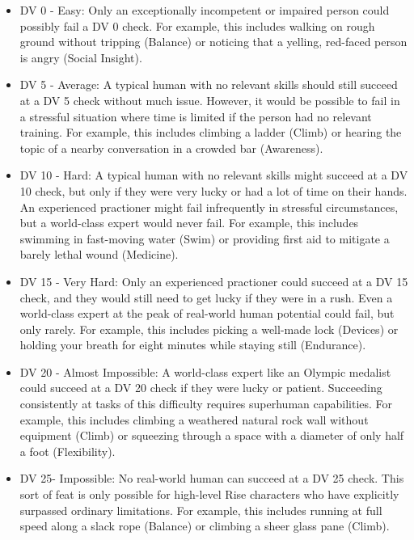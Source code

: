         \begin{itemize}
            \item DV 0 - Easy: Only an exceptionally incompetent or impaired person could possibly fail a DV 0 check. For example, this includes walking on rough ground without tripping (Balance) or noticing that a yelling, red-faced person is angry (Social Insight).
            \item DV 5 - Average: A typical human with no relevant skills should still succeed at a DV 5 check without much issue. However, it would be possible to fail in a stressful situation where time is limited if the person had no relevant training. For example, this includes climbing a ladder (Climb) or hearing the topic of a nearby conversation in a crowded bar (Awareness).
            \item DV 10 - Hard: A typical human with no relevant skills might succeed at a DV 10 check, but only if they were very lucky or had a lot of time on their hands. An experienced practioner might fail infrequently in stressful circumstances, but a world-class expert would never fail. For example, this includes swimming in fast-moving water (Swim) or providing first aid to mitigate a barely lethal wound (Medicine).
            \item DV 15 - Very Hard: Only an experienced practioner could succeed at a DV 15 check, and they would still need to get lucky if they were in a rush. Even a world-class expert at the peak of real-world human potential could fail, but only rarely. For example, this includes picking a well-made lock (Devices) or holding your breath for eight minutes while staying still (Endurance).
            \item DV 20 - Almost Impossible: A world-class expert like an Olympic medalist could succeed at a DV 20 check if they were lucky or patient. Succeeding consistently at tasks of this difficulty requires superhuman capabilities. For example, this includes climbing a weathered natural rock wall without equipment (Climb) or squeezing through a space with a diameter of only half a foot (Flexibility).
            \item DV 25\add - Impossible: No real-world human can succeed at a DV 25 check. This sort of feat is only possible for high-level Rise characters who have explicitly surpassed ordinary limitations. For example, this includes running at full speed along a slack rope (Balance) or climbing a sheer glass pane (Climb).
        \end{itemize}

